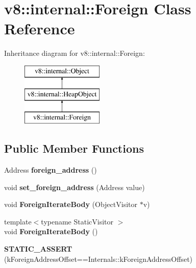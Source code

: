 \hypertarget{classv8_1_1internal_1_1_foreign}{}\section{v8\+:\+:internal\+:\+:Foreign Class Reference}
\label{classv8_1_1internal_1_1_foreign}
Inheritance diagram for v8\+:\+:internal\+:\+:Foreign\+:\begin{figure}[H]
\begin{center}
\leavevmode
\includegraphics[height=3.000000cm]{classv8_1_1internal_1_1_foreign}
\end{center}
\end{figure}
\subsection*{Public Member Functions}
\begin{DoxyCompactItemize}
\item 
\hypertarget{classv8_1_1internal_1_1_foreign_a83ec0799841a8ecfe8d629da4859b621}{}Address {\bfseries foreign\+\_\+address} ()\label{classv8_1_1internal_1_1_foreign_a83ec0799841a8ecfe8d629da4859b621}

\item 
\hypertarget{classv8_1_1internal_1_1_foreign_ace19e115c4f5c904eedf4ac4aca3feda}{}void {\bfseries set\+\_\+foreign\+\_\+address} (Address value)\label{classv8_1_1internal_1_1_foreign_ace19e115c4f5c904eedf4ac4aca3feda}

\item 
\hypertarget{classv8_1_1internal_1_1_foreign_ac89642dcd63e99bbd50a535203e92148}{}void {\bfseries Foreign\+Iterate\+Body} (Object\+Visitor $\ast$v)\label{classv8_1_1internal_1_1_foreign_ac89642dcd63e99bbd50a535203e92148}

\item 
\hypertarget{classv8_1_1internal_1_1_foreign_ad87ccdb16147542d763b5650e87dff4d}{}{\footnotesize template$<$typename Static\+Visitor $>$ }\\void {\bfseries Foreign\+Iterate\+Body} ()\label{classv8_1_1internal_1_1_foreign_ad87ccdb16147542d763b5650e87dff4d}

\item 
\hypertarget{classv8_1_1internal_1_1_foreign_a045665be8925ea25c51632d5502d713e}{}{\bfseries S\+T\+A\+T\+I\+C\+\_\+\+A\+S\+S\+E\+R\+T} (k\+Foreign\+Address\+Offset==Internals\+::k\+Foreign\+Address\+Offset)\label{classv8_1_1internal_1_1_foreign_a045665be8925ea25c51632d5502d713e}

\end{DoxyCompactItemize}
